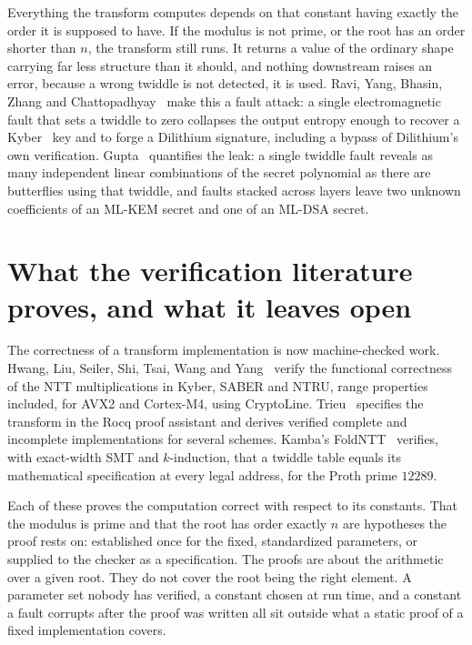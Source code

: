 \documentclass{article}
\begin{document}
Everything the transform computes depends on that constant having exactly the order it is supposed to have. If the modulus is not prime, or the root has an order shorter than \(n\), the transform still runs. It returns a value of the ordinary shape carrying far less structure than it should, and nothing downstream raises an error, because a wrong twiddle is not detected, it is used. Ravi, Yang, Bhasin, Zhang and Chattopadhyay~\cite{ravi} make this a fault attack: a single electromagnetic fault that sets a twiddle to zero collapses the output entropy enough to recover a Kyber~\cite{kyber} key and to forge a Dilithium signature, including a bypass of Dilithium's own verification. Gupta~\cite{gupta} quantifies the leak: a single twiddle fault reveals as many independent linear combinations of the secret polynomial as there are butterflies using that twiddle, and faults stacked across layers leave two unknown coefficients of an ML-KEM secret and one of an ML-DSA secret.

\section{What the verification literature proves, and what it leaves open}

The correctness of a transform implementation is now machine-checked work. Hwang, Liu, Seiler, Shi, Tsai, Wang and Yang~\cite{hwang} verify the functional correctness of the NTT multiplications in Kyber, SABER and NTRU, range properties included, for AVX2 and Cortex-M4, using CryptoLine. Trieu~\cite{trieu} specifies the transform in the Rocq proof assistant and derives verified complete and incomplete implementations for several schemes. Kamba's FoldNTT~\cite{foldntt} verifies, with exact-width SMT and \(k\)-induction, that a twiddle table equals its mathematical specification at every legal address, for the Proth prime \(12289\).

Each of these proves the computation correct with respect to its constants. That the modulus is prime and that the root has order exactly \(n\) are hypotheses the proof rests on: established once for the fixed, standardized parameters, or supplied to the checker as a specification. The proofs are about the arithmetic over a given root. They do not cover the root being the right element. A parameter set nobody has verified, a constant chosen at run time, and a constant a fault corrupts after the proof was written all sit outside what a static proof of a fixed implementation covers.
\end{document}
